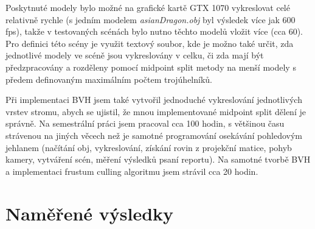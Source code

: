 \documentclass[report,11pt]{elsarticle}
\begin{document}
Poskytnuté modely bylo možné na grafické kartě GTX 1070 vykreslovat celé
relativně rychle (s jedním modelem \textit{asianDragon.obj} byl výsledek více jak
600 fps), takže v testovaných scénách bylo nutno těchto modelů vložit více
(cca 60). Pro definici této scény je využit textový soubor, kde je možno také
určit, zda jednotlivé modely ve scéně jsou vykreslovány v celku, či zda mají být
předzpracovány a rozděleny pomocí midpoint split metody na menší modely s předem
definovaným maximálním počtem trojúhelníků.

Při implementaci BVH jsem také vytvořil jednoduché vykreslování jednotlivých
vrstev stromu, abych se ujistil, že mnou implementované midpoint split dělení
je správně. Na semestrální práci jsem pracoval cca 100 hodin, s většinou času
strávenou na jiných věcech než je samotné programování osekávání pohledovým
jehlanem (načítání obj, vykreslování, získání rovin z projekční matice, pohyb
kamery, vytváření scén, měření výsledků psaní reportu). Na samotné tvorbě BVH
a implementaci frustum culling algoritmu jsem strávil cca 20 hodin.



\section{\label{SEC:Results}Naměřené výsledky}
\end{document}
